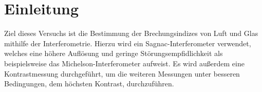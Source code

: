 \section{Einleitung}
Ziel dieses Versuchs ist die Bestimmung der Brechungsindizes von Luft und Glas mithilfe der Interferometrie. Hierzu wird ein Sagnac-Interferometer verwendet, welches eine höhere Auflösung und
geringe Störungsempfidlichkeit als beispielsweise das Michelson-Interferometer aufweist.
Es wird außerdem eine Kontrastmessung durchgeführt, um die weiteren Messungen unter besseren Bedingungen, dem höchsten Kontrast, durchzuführen.
